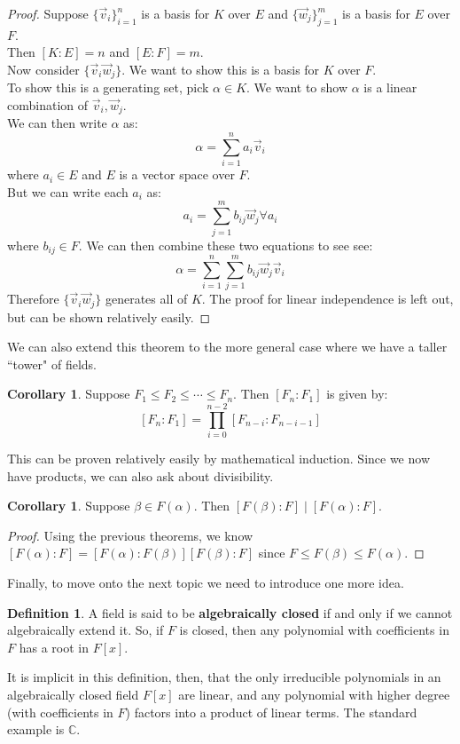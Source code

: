\documentclass[11pt]{amsart}
\theoremstyle{definition}
\newtheorem{definition}[theorem]{Definition}
\newtheorem{corollary}[theorem]{Corollary}
\newcommand{\complexNumbers}{\mathbb{C}}
\begin{document}
\begin{proof}
	Suppose $\{ \vec{v}_i\}_{i = 1}^{n}$ is a basis for $K$ over $E$ and $\{ \vec{w}_j\}_{j = 1}^{m}$ is a basis for $E$ over $F$. \\
	Then $[K : E] = n$ and $[E : F] = m$. \\
	Now consider $\{ \vec{v}_i \vec{w}_j \}$. We want to show this is a basis for $K$ over $F$. \\
	To show this is a generating set, pick $\alpha \in K$. We want to show $\alpha$ is a linear combination of $\vec{v}_i, \vec{w}_j$. \\
	We can then write $\alpha$ as:
	\[
		\alpha = \sum_{i = 1}^{n} a_i \vec{v}_i
	\] 
	where $a_i \in E$ and $E$ is a vector space over $F$. \\
	But we can write each $a_i$ as:
	\[
		a_i = \sum_{j = 1}^{m} b_{ij}\vec{w}_j \forall a_i
	\]
	where $b_{ij} \in F$. We can then combine these two equations to see see:
	\[
		\alpha = \sum_{i = 1}^n \sum_{j = 1}^m b_{ij} \vec{w}_j \vec{v}_i
	\]
	Therefore $\{ \vec{v}_i \vec{w}_j \}$ generates all of $K$. The proof for linear independence is left out, but can be shown relatively
	easily.
\end{proof}
We can also extend this theorem to the more general case where we have a taller ``tower" of fields.
\begin{corollary}
	Suppose $F_1 \leq F_2 \leq \cdots \leq F_n$. Then $[ F_n : F_1 ]$ is given by:
	\[
		[ F_n : F_1 ] = \prod_{i = 0}^{n - 2} [ F_{n - i} : F_{n - i - 1} ]
	\]
\end{corollary}
This can be proven relatively easily by mathematical induction. Since we now have products, we can also ask about divisibility.
\begin{corollary}
	Suppose $\beta \in F(\alpha)$. Then $[ F(\beta) : F ] \mid [ F(\alpha) : F]$.
\end{corollary}
\begin{proof}
	Using the previous theorems, we know $[ F(\alpha) : F ] = [ F(\alpha) : F(\beta) ][ F(\beta) : F ]$ since
	$F \leq F(\beta) \leq F(\alpha)$.
\end{proof}

Finally, to move onto the next topic we need to introduce one more idea.
\begin{definition}
	A field is said to be \textbf{algebraically closed} if and only if we cannot algebraically extend it. So, if $F$ is closed, then any polynomial
	with coefficients in $F$ has a root in $F[x]$.
\end{definition}
It is implicit in this definition, then, that the only irreducible polynomials in an algebraically closed field $F[x]$ are linear, and any polynomial with
higher degree (with coefficients in $F$) factors into a product of linear terms. The standard example is $\complexNumbers$.
\end{document}
